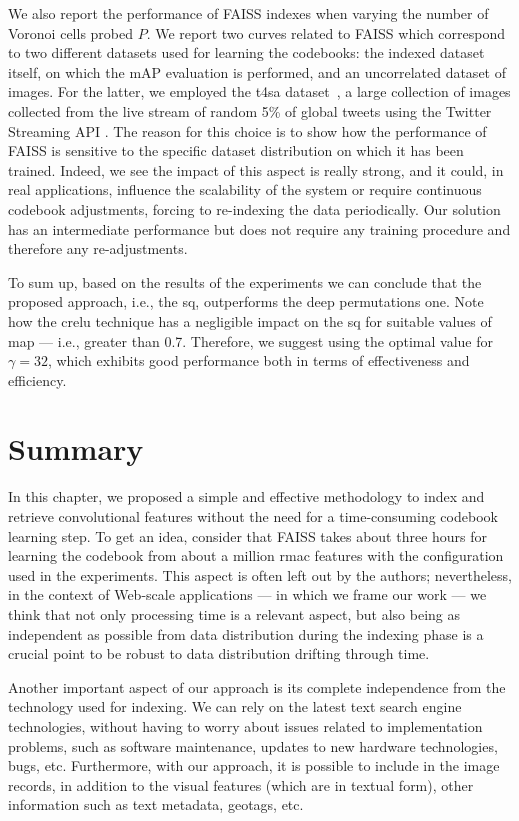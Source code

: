 We also report the performance of FAISS indexes when varying the number of Voronoi cells probed $P$.
We report two curves related to FAISS which correspond to two different datasets used for learning the codebooks: the indexed dataset itself, on which the mAP evaluation is performed, and an uncorrelated dataset of images.
For the latter, we employed the \gls{t4sa} dataset~\cite{vadicamo2017cross}, a large collection of images collected from the live stream of random 5\% of global tweets using the Twitter Streaming API .
The reason for this choice is to show how the performance of FAISS is sensitive to the specific dataset distribution on which it has been trained.
Indeed, we see the impact of this aspect is really strong, and it could, in real applications, influence the scalability of the system or require continuous codebook adjustments, forcing to re-indexing the data periodically.
Our solution has an intermediate performance but does not require any training procedure and therefore any re-adjustments.

To sum up, based on the results of the experiments we can conclude that the proposed approach, i.e., the \gls{sq}, outperforms the deep permutations one.
Note how the \gls{crelu} technique has a negligible impact on the \gls{sq} for suitable values of \gls{map} --- i.e., greater than 0.7.
Therefore, we suggest using the optimal value for $\gamma=32$, which exhibits good performance both in terms of effectiveness and efficiency.


\section{Summary}
\label{sec:str:conclusion}
In this chapter, we proposed a simple and effective methodology to index and retrieve convolutional features without the need for a time-consuming codebook learning step.
To get an idea, consider that FAISS takes about three hours for learning the codebook from about a million \gls{rmac} features with the configuration used in the experiments.
This aspect is often left out by the authors;
nevertheless, in the context of Web-scale applications --- in which we frame our work --- we think that not only processing time is a relevant aspect, but also being as independent as possible from data distribution during the indexing phase is a crucial point to be robust to data distribution drifting through time.

Another important aspect of our approach is its complete independence from the technology used for indexing.
We can rely on the latest text search engine technologies, without having to worry about issues related to implementation problems, such as software maintenance, updates to new hardware technologies, bugs, etc.
Furthermore, with our approach, it is possible to include in the image records, in addition to the visual features (which are in textual form), other information such as text metadata, geotags, etc.
